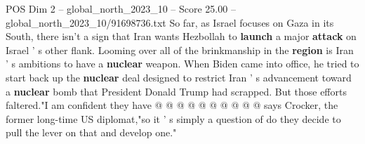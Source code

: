 \begin{textsample}{POS Dim 2 – global\_north\_2023\_10 – Score 25.00 – global\_north\_2023\_10/91698736.txt}
So far, as Israel focuses on Gaza in its South, there isn't a sign that Iran wants Hezbollah to \textbf{launch} a major \textbf{attack} on Israel ' s other flank.
Looming over all of the brinkmanship in the \textbf{region} is Iran ' s ambitions to have a \textbf{nuclear} weapon.
When Biden came into office, he tried to start back up the \textbf{nuclear} deal designed to restrict Iran ' s advancement toward a \textbf{nuclear} bomb that President Donald Trump had scrapped.
But those efforts faltered."I am confident they have @ @ @ @ @ @ @ @ @ @ says Crocker, the former long-time US diplomat,"so it ' s simply a question of do they decide to pull the lever on that and develop one."

\end{textsample}
